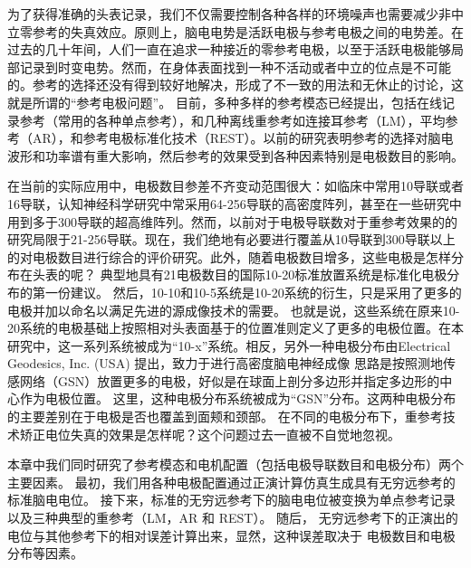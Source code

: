 为了获得准确的头表记录，我们不仅需要控制各种各样的环境噪声也需要减少非中立零参考的失真效应。原则上，脑电电势是活跃电极与参考电极之间的电势差。在过去的几十年间，人们一直在追求一种接近的零参考电极，以至于活跃电极能够局部记录到时变电势。然而，在身体表面找到一种不活动或者中立的位点是不可能的。参考的选择还没有得到较好地解决，形成了不一致的用法和无休止的讨论，这就是所谓的“参考电极问题”。 目前，多种多样的参考模态已经提出，包括在线记录参考（常用的各种单点参考），和几种离线重参考如连接耳参考（LM），平均参考（AR），和参考电极标准化技术（REST）。以前的研究表明参考的选择对脑电波形和功率谱有重大影响，然后参考的效果受到各种因素特别是电极数目的影响。

在当前的实际应用中，电极数目参差不齐变动范围很大：如临床中常用10导联或者16导联，认知神经科学研究中常采用64-256导联的高密度阵列，甚至在一些研究中用到多于300导联的超高维阵列。然而，以前对于电极导联数对于重参考效果的的研究局限于21-256导联。现在，我们绝地有必要进行覆盖从10导联到300导联以上的对电极数目进行综合的评价研究。此外，随着电极数目增多，这些电极是怎样分布在头表的呢？ 典型地具有21电极数目的国际10-20标准放置系统是标准化电极分布的第一份建议。 然后，10-10和10-5系统是10-20系统的衍生，只是采用了更多的电极并加以命名以满足先进的源成像技术的需要。 也就是说，这些系统在原来10-20系统的电极基础上按照相对头表面基于的位置准则定义了更多的电极位置。在本研究中，这一系列系统被成为“10-x”系统。相反，另外一种电极分布由Electrical Geodesics, Inc. (USA) 提出，致力于进行高密度脑电神经成像 思路是按照测地传感网络（GSN）放置更多的电极，好似是在球面上剖分多边形并指定多边形的中心作为电极位置。 这里，这种电极分布系统被成为“GSN”分布。这两种电极分布的主要差别在于电极是否也覆盖到面颊和颈部。 在不同的电极分布下，重参考技术矫正电位失真的效果是怎样呢？这个问题过去一直被不自觉地忽视。

本章中我们同时研究了参考模态和电机配置（包括电极导联数目和电极分布）两个主要因素。 最初，我们用各种电极配置通过正演计算仿真生成具有无穷远参考的标准脑电电位。 接下来，标准的无穷远参考下的脑电电位被变换为单点参考记录以及三种典型的重参考（LM，AR 和 REST）。 随后， 无穷远参考下的正演出的电位与其他参考下的相对误差计算出来，显然，这种误差取决于 电极数目和电极分布等因素。

